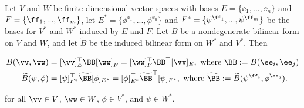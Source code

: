 \begin{lemma}
     Let $V$ and $W$ be finite-dimensional vector spaces with bases $E = \{\ee_1, ..., \ee_n\}$ and $F = \{\ff_1, ..., \ff_m\}$, let $E^* = \{\phi^{\ee_1}, ..., \phi^{\ee_n}\}$ and $F^* = \{\psi^{\ff_1}, ..., \psi^{\ff_m}\}$ be the bases for $V^*$ and $W^*$ induced by $E$ and $F$. Let $B$ be a nondegenerate bilinear form on $V$ and $W$, and let $\widetilde{B}$ be the induced bilinear form on $W^*$ and $V^*$. Then 

    \begin{align*}
        B(\vv, \ww) &= [\vv]_E^\top \BB [\ww]_F = [\ww]_F^\top \BB^\top [\vv]_E, \text{ where $\BB := B(\ee_i, \ee_j)$}
        \\
        \widetilde{B}(\psi, \phi) &= [\psi]_{F^*}^\top \widetilde{\BB} [\phi]_{E^*} = [\phi]_{E^*}^\top \widetilde{\BB}^\top [\psi]_{F^*}, \text{ where $\widetilde{\BB} := \widetilde{B}(\psi^{\ff_i}, \phi^{\ee_j})$}.
    \end{align*}
    
    for all $\vv \in V$, $\ww \in W$, $\phi \in V^*$, and $\psi \in W^*$.
\end{lemma}

